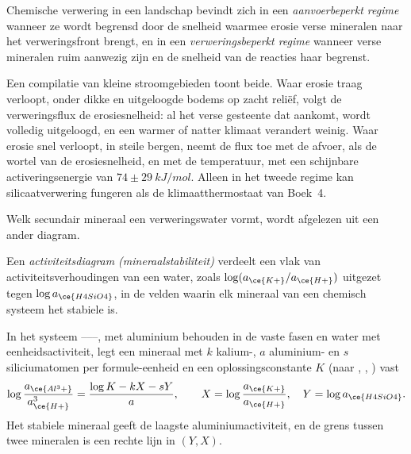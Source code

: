 \begin{definition}[Verweringsregimes]\label{def:b3:water-rock-interaction:regimes}
Chemische verwering in een landschap bevindt zich in een \emph{aanvoerbeperkt
regime} wanneer ze wordt begrensd door de snelheid waarmee
erosie verse mineralen naar het verweringsfront brengt, en in een
\emph{verweringsbeperkt regime} wanneer verse
mineralen ruim aanwezig zijn en de snelheid van de reacties haar begrenst.
\end{definition}

Een compilatie van kleine stroomgebieden toont beide. Waar erosie traag verloopt,
onder dikke en uitgeloogde bodems op zacht reliëf, volgt de verweringsflux de
erosiesnelheid: al het verse gesteente dat aankomt, wordt volledig uitgeloogd, en
een warmer of natter klimaat verandert weinig. Waar erosie snel verloopt, in steile
bergen, neemt de flux toe met de afvoer, als de wortel van de erosiesnelheid, en met
de temperatuur, met een schijnbare activeringsenergie van $74 \pm
\qty{29}{kJ/mol}$. Alleen in het tweede regime kan silicaatverwering
fungeren als de klimaatthermostaat van Boek~4.

Welk secundair mineraal een verweringswater vormt, wordt afgelezen uit een ander
diagram.

\begin{definition}[Activiteitsdiagram]\label{def:b3:water-rock-interaction:activity-diagram}
Een \emph{activiteitsdiagram (mineraalstabiliteit)}
verdeelt een vlak van activiteitsverhoudingen van een water, zoals
$\log(a_{\ce{K+}}/a_{\ce{H+}})$ uitgezet tegen $\log a_{\ce{H4SiO4}}$, in de
velden waarin elk mineraal van een chemisch systeem het stabiele is.
\end{definition}

\begin{proposition}\label{prop:b3:water-rock-interaction:boundaries}
In het systeem ------, met aluminium behouden in de
vaste fasen en water met eenheidsactiviteit, legt een mineraal met $k$ kalium-,
$a$ aluminium- en $s$ siliciumatomen per formule-eenheid en een oplossingsconstante $K$
(naar , , ) vast
\[
\log\frac{a_{\ce{Al^3+}}}{a_{\ce{H+}}^3} = \frac{\log K - kX - sY}{a},
\qquad X = \log\frac{a_{\ce{K+}}}{a_{\ce{H+}}},\quad Y = \log a_{\ce{H4SiO4}}.
\]
Het stabiele mineraal geeft de laagste aluminiumactiviteit, en de grens
tussen twee mineralen is een rechte lijn in $(Y, X)$.
\end{proposition}


